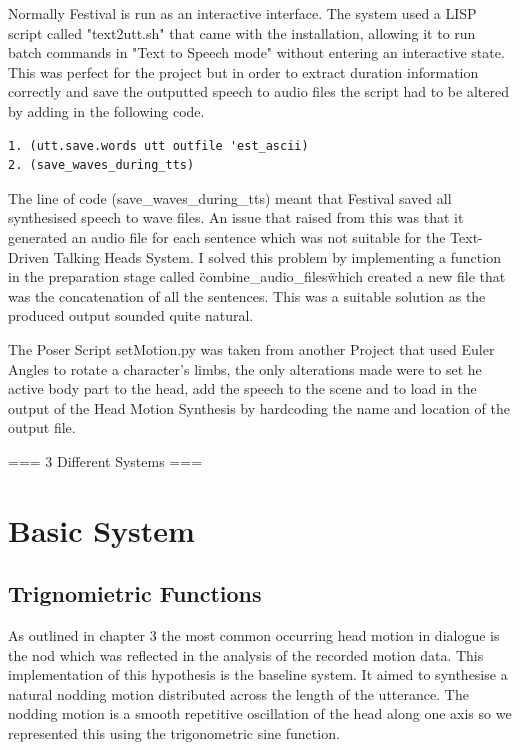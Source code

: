 \documentclass[bsc,frontabs,twoside,singlespacing,parskip]{infthesis}
\begin{document}
Normally Festival is run as an interactive interface. The system used a LISP script called "text2utt.sh" that came with the installation, allowing it to run batch commands in "Text to Speech mode" without entering an interactive state. This was perfect for the project but in order to extract duration information correctly and save the outputted speech to audio files the script had to be altered by adding in the following code. 

\begin{lstlisting}
1. (utt.save.words utt outfile 'est_ascii) 
2. (save_waves_during_tts)
\end{lstlisting}

The line of code (save\_waves\_during\_tts) meant that Festival saved all synthesised speech to wave files. An issue that raised from this was that it generated an audio file for each sentence which was not suitable for the Text-Driven Talking Heads System. I solved this problem by implementing a function in the preparation stage called \"combine\_audio\_files\" which created a new file that was the concatenation of all the sentences. This was a suitable solution as the produced output sounded quite natural.

The Poser Script setMotion.py was taken from another Project that used Euler Angles to rotate a character's limbs, the only alterations made were to set he active body part to the head, add the speech to the scene and to load in the output of the Head Motion Synthesis by hardcoding the name and location of the output file.

=== 3 Different Systems ===



\section{Basic System} 

\subsection{Trignomietric Functions}

As outlined in chapter 3 the most common occurring head motion in dialogue is the nod which was reflected in the analysis of the recorded motion data. This implementation of this hypothesis is the baseline system. It aimed to synthesise a natural nodding motion distributed across the length of the utterance. The nodding motion is a smooth repetitive oscillation of the head along one axis so we represented this using the trigonometric sine function. 
\end{document}
